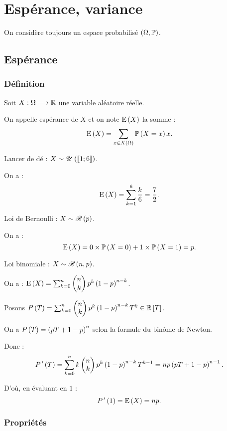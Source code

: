 \section{Espérance, variance}

On considère toujours un espace probabilisé \(\groupe{\Omega}[\prem]\).

\subsection{Espérance}

\subsubsection{Définition}

\begin{defi}
Soit \(X:\Omega\to\R\) une variable aléatoire réelle.

On appelle espérance de \(X\) et on note \(\esp{X}\) la somme : \[\esp{X}=\sum_{x\in X\paren{\Omega}}\proba{X=x}x.\]
\end{defi}

\begin{ex}
Lancer de dé : \(X\sim\loiuniforme{\interventierii{1}{6}}\).

On a : \[\esp{X}=\sum_{k=1}^6\dfrac{k}{6}=\dfrac{7}{2}.\]
\end{ex}

\begin{ex}
Loi de Bernoulli : \(X\sim\loibernoulli{p}\).

On a : \[\esp{X}=0\times\proba{X=0}+1\times\proba{X=1}=p.\]
\end{ex}

\begin{ex}
Loi binomiale : \(X\sim\loibinomiale{n}{p}\).

On a : \(\esp{X}=\sum_{k=0}^n\binom{k}{n}p^k\paren{1-p}^{n-k}\).

Posons \(P\paren{T}=\sum_{k=0}^n\binom{k}{n}p^k\paren{1-p}^{n-k}T^k\in\poly[\R][T]\).

On a \(P\paren{T}=\paren{pT+1-p}^n\) selon la formule du binôme de Newton.

Donc : \[P\prim\paren{T}=\sum_{k=0}^nk\binom{k}{n}p^k\paren{1-p}^{n-k}T^{k-1}=np\paren{pT+1-p}^{n-1}.\]

D'où, en évaluant en \(1\) : \[P\prim\paren{1}=\esp{X}=np.\]
\end{ex}

\subsubsection{Propriétés}


